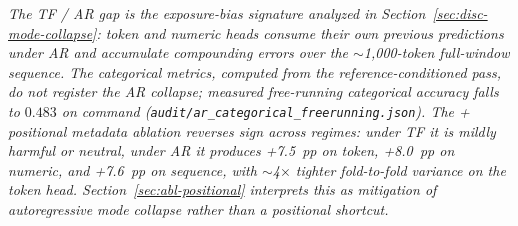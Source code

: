 \begin{table}[!htbp]
\footnotesize\textit{The TF / AR gap is the exposure-bias signature analyzed in Section~\ref{sec:disc-mode-collapse}: token and numeric heads consume their own previous predictions under AR and accumulate compounding errors over the $\sim$1{,}000-token full-window sequence. The categorical metrics, computed from the reference-conditioned pass, do not register the AR collapse; measured free-running categorical accuracy falls to $0.483$ on command (\texttt{audit/ar\_categorical\_freerunning.json}). The \emph{+ positional metadata} ablation reverses sign across regimes: under TF it is mildly harmful or neutral, under AR it produces +7.5~pp on token, +8.0~pp on numeric, and +7.6~pp on sequence, with $\sim$4$\times$ tighter fold-to-fold variance on the token head. Section~\ref{sec:abl-positional} interprets this as mitigation of autoregressive mode collapse rather than a positional shortcut.}
\end{table}
